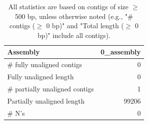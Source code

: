 \documentclass[12pt,a4paper]{article}
\begin{document}
\begin{table}[ht]
\begin{center}
\caption{All statistics are based on contigs of size $\geq$ 500 bp, unless otherwise noted (e.g., "\# contigs ($\geq$ 0 bp)" and "Total length ($\geq$ 0 bp)" include all contigs).}
\begin{tabular}{|l*{1}{|r}|}
\hline
Assembly & 0\_assembly \\ \hline
\# fully unaligned contigs & 0 \\ \hline
Fully unaligned length & 0 \\ \hline
\# partially unaligned contigs & 1 \\ \hline
Partially unaligned length & 99206 \\ \hline
\# N's & 0 \\ \hline
\end{tabular}
\end{center}
\end{table}
\end{document}
